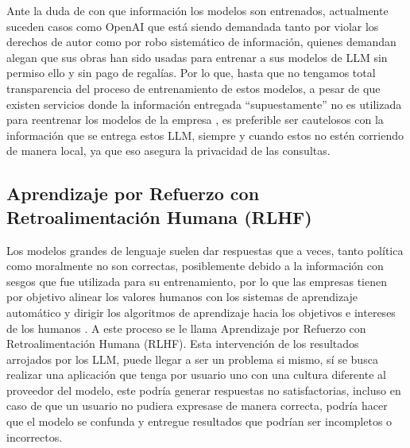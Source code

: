 Ante la duda de con que información los modelos son entrenados, actualmente suceden casos como OpenAI que está siendo demandada tanto por violar los derechos de autor \cite{privacidad3} como por robo sistemático \cite{privacidad2} de información, quienes 
demandan alegan que sus obras han sido usadas para entrenar a sus modelos de LLM sin permiso ello y sin pago de regalías. Por lo que, hasta que no tengamos total transparencia del proceso de entrenamiento de estos modelos, 
a pesar de que existen servicios donde la información entregada ``supuestamente'' no es utilizada para reentrenar los modelos de la empresa \cite{openai4}, es preferible ser cautelosos con la 
información que se entrega estos LLM, siempre y cuando estos no estén corriendo de manera local, ya que eso asegura la privacidad de las consultas.



\subsection{Aprendizaje por Refuerzo con Retroalimentación Humana (RLHF)}


Los modelos grandes de lenguaje suelen dar respuestas que a veces, tanto política como moralmente no son correctas, posiblemente debido a la información con sesgos que fue utilizada para su entrenamiento, por lo que 
las empresas tienen por objetivo alinear los valores humanos con los sistemas de aprendizaje automático y dirigir los algoritmos 
de aprendizaje hacia los objetivos e intereses de los humanos \cite{RLHF}. A este proceso se le llama Aprendizaje por Refuerzo con 
Retroalimentación Humana (RLHF). 
Esta intervención de los resultados arrojados por los LLM, puede llegar a ser un problema si mismo, sí se busca realizar una aplicación que tenga por usuario uno con una cultura diferente al proveedor del modelo, este podría generar respuestas no satisfactorias, incluso en caso de que un usuario no pudiera expresase de manera correcta, podría hacer que el modelo se confunda y entregue resultados que podrían ser incompletos o incorrectos.
